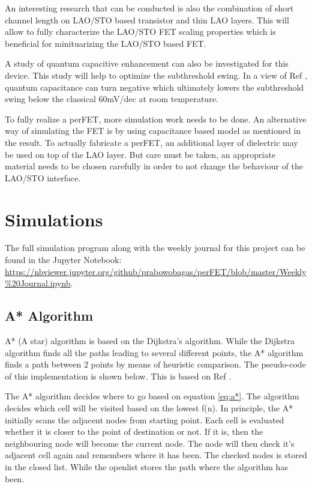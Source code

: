 \documentclass[11pt,a4paper]{report}
\begin{document}
An interesting research that can be conducted is also the combination of short channel length on LAO/STO based transistor \cite{woltmann_harada_boschker_srot_aken_klauk_mannhart_2015} and thin LAO layers. This will allow to fully characterize the LAO/STO FET scaling properties which is beneficial for minituarizing the LAO/STO based FET.

A study of quantum capacitive enhancement can also be investigated for this device. This study will help to optimize the subthreshold swing. In a view of Ref \cite{li_Large_capacitance_enhancement_2011}, quantum capacitance can turn negative which ultimately lowers the subthreshold swing below the classical 60mV/dec at room temperature.

To fully realize a perFET, more simulation work needs to be done. An alternative way of simulating the FET is by using capacitance based model as mentioned in the result. To actually fabricate a perFET, an additional layer of dielectric may be used on top of the LAO layer. But care must be taken, an appropriate material needs to be chosen carefully in order to not change the behaviour of the LAO/STO interface. 

\appendix
\chapter{Simulations}
The full simulation program along with the weekly journal for this project can be found in the Jupyter Notebook: \url{https://nbviewer.jupyter.org/github/prabowobagas/perFET/blob/master/Weekly\%20Journal.ipynb}.

\section{A* Algorithm}
A* (A star) algorithm is based on the Dijkstra's algorithm. While the Dijkstra algorithm finds all the paths leading to several different points, the A* algorithm finds a path between 2 points by means of heuristic comparison. The pseudo-code of this implementation is shown below. This is based on Ref \cite{A*search}.

The A* algorithm decides where to go based on equation \ref{eq:a*}. The algorithm decides which cell will be visited based on the lowest f(n). In principle, the A* initially scans the adjacent nodes from starting point. Each cell is evaluated whether it is closer to the point of destination or not. If it is, then the neighbouring node will become the current node. The node will then check it's adjacent cell again and remembers where it has been. The checked nodes is stored in the closed list. While the openlist stores the path where the algorithm has been.
\end{document}
